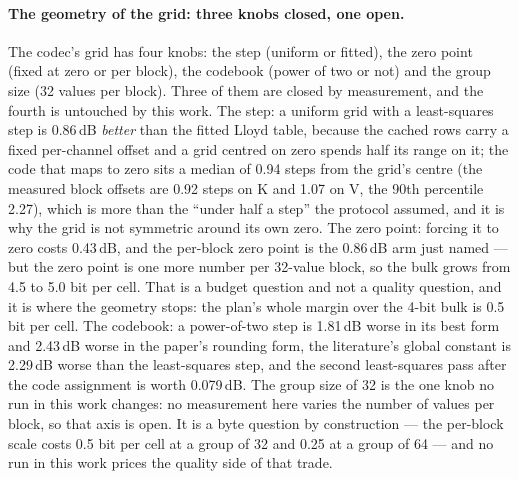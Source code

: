 \documentclass[10pt,twocolumn]{article}
\begin{document}
\paragraph{The geometry of the grid: three knobs closed, one open.} The codec's grid has four knobs: the step (uniform or fitted), the zero point (fixed at zero or per block), the codebook (power of two or not) and the group size (32 values per block). Three of them are closed by measurement, and the fourth is untouched by this work. The step: a uniform grid with a least-squares step is 0.86\,dB \emph{better} than the fitted Lloyd table, because the cached rows carry a fixed per-channel offset and a grid centred on zero spends half its range on it; the code that maps to zero sits a median of 0.94 steps from the grid's centre (the measured block offsets are 0.92 steps on K and 1.07 on V, the 90th percentile 2.27), which is more than the ``under half a step'' the protocol assumed, and it is why the grid is not symmetric around its own zero. The zero point: forcing it to zero costs 0.43\,dB, and the per-block zero point is the 0.86\,dB arm just named --- but the zero point is one more number per 32-value block, so the bulk grows from 4.5 to 5.0 bit per cell. That is a budget question and not a quality question, and it is where the geometry stops: the plan's whole margin over the 4-bit bulk is 0.5 bit per cell. The codebook: a power-of-two step is 1.81\,dB worse in its best form and 2.43\,dB worse in the paper's rounding form, the literature's global constant is 2.29\,dB worse than the least-squares step, and the second least-squares pass after the code assignment is worth 0.079\,dB. The group size of 32 is the one knob no run in this work changes: no measurement here varies the number of values per block, so that axis is open. It is a byte question by construction --- the per-block scale costs 0.5 bit per cell at a group of 32 and 0.25 at a group of 64 --- and no run in this work prices the quality side of that trade.
\end{document}
